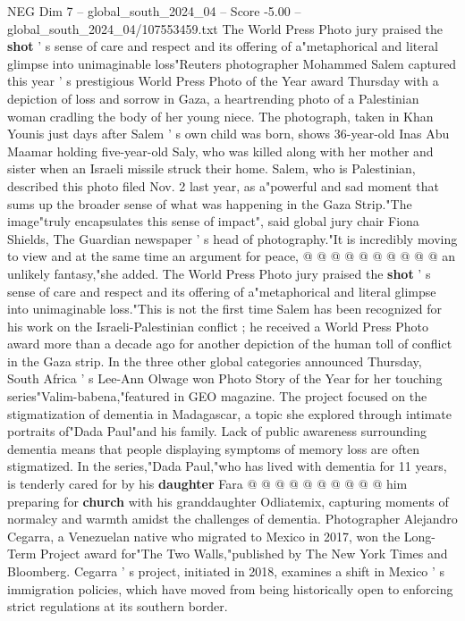 \begin{textsample}{NEG Dim 7 – global\_south\_2024\_04 – Score -5.00 – global\_south\_2024\_04/107553459.txt}  \label{ex:f7_neg_345}
The World Press Photo jury praised the \textbf{shot} ' s sense of care and respect and its offering of a"metaphorical and literal glimpse into unimaginable loss"Reuters photographer Mohammed Salem captured this year ' s prestigious World Press Photo of the Year award Thursday with a depiction of loss and sorrow in Gaza, a heartrending photo of a Palestinian woman cradling the body of her young niece.
The photograph, taken in Khan Younis just days after Salem ' s own child was born, shows 36-year-old Inas Abu Maamar holding five-year-old Saly, who was killed along with her mother and sister when an Israeli missile struck their home.
Salem, who is Palestinian, described this photo filed Nov. 2 last year, as a"powerful and sad moment that sums up the broader sense of what was happening in the Gaza Strip."The image"truly encapsulates this sense of impact", said global jury chair Fiona Shields, The Guardian newspaper ' s head of photography."It is incredibly moving to view and at the same time an argument for peace, @ @ @ @ @ @ @ @ @ @ an unlikely fantasy,"she added.
The World Press Photo jury praised the \textbf{shot} ' s sense of care and respect and its offering of a"metaphorical and literal glimpse into unimaginable loss."This is not the first time Salem has been recognized for his work on the Israeli-Palestinian conflict ; he received a World Press Photo award more than a decade ago for another depiction of the human toll of conflict in the Gaza strip.
In the three other global categories announced Thursday, South Africa ' s Lee-Ann Olwage won Photo Story of the Year for her touching series"Valim-babena,"featured in GEO magazine.
The project focused on the stigmatization of dementia in Madagascar, a topic she explored through intimate portraits of"Dada Paul"and his family.
Lack of public awareness surrounding dementia means that people displaying symptoms of memory loss are often stigmatized.
In the series,"Dada Paul,"who has lived with dementia for 11 years, is tenderly cared for by his \textbf{daughter} Fara @ @ @ @ @ @ @ @ @ @ him preparing for \textbf{church} with his granddaughter Odliatemix, capturing moments of normalcy and warmth amidst the challenges of dementia.
Photographer Alejandro Cegarra, a Venezuelan native who migrated to Mexico in 2017, won the Long-Term Project award for"The Two Walls,"published by The New York Times and Bloomberg.
Cegarra ' s project, initiated in 2018, examines a shift in Mexico ' s immigration policies, which have moved from being historically open to enforcing strict regulations at its southern border.

\end{textsample}
